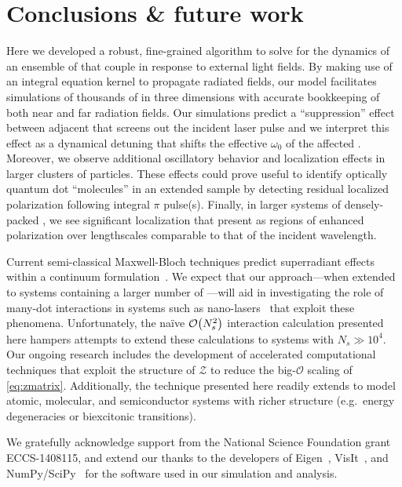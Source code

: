 \section{\label{section:conclusion}Conclusions \& future work}
Here we developed a robust, fine-grained algorithm to solve for the dynamics of an ensemble of \qds{} that couple in response to external light fields.
By making use of an integral equation kernel to propagate radiated fields, our model facilitates simulations of thousands of \qds{} in three dimensions with accurate bookkeeping of both near and far radiation fields.
Our simulations predict a ``suppression'' effect between adjacent \qds{} that screens out the incident laser pulse and we interpret this effect as a dynamical detuning that shifts the effective $\omega_0$ of the affected \qds{}.
Moreover, we observe additional oscillatory behavior and localization effects in larger clusters of particles.
These effects could prove useful to identify optically quantum dot ``molecules'' in an extended sample by detecting residual localized polarization following integral $\pi$ pulse(s).
Finally, in larger systems of densely-packed \qds{}, we see significant localization that present as regions of enhanced polarization over lengthscales comparable to that of the incident wavelength.

Current semi-classical Maxwell-Bloch techniques predict superradiant effects within a continuum formulation~\cite{Gross1982,PhysRevA.4.302,PhysRevA.4.854}.
We expect that our approach---when extended to systems containing a larger number of \qds{}---will aid in investigating the role of many-dot interactions in systems such as nano-lasers~\cite{jahnke2016giant} that exploit these phenomena.
Unfortunately, the na\"ive $\mathcal{O}\qty(N_s^2)$ interaction calculation presented here hampers attempts to extend these calculations to systems with $N_s \gg 10^4$.
Our ongoing research includes the development of accelerated computational techniques that exploit the structure of $\mathcal{Z}$ to reduce the big-$\mathcal{O}$ scaling of \cref{eq:zmatrix}.
Additionally, the technique presented here readily extends to model atomic, molecular, and semiconductor systems with richer structure (e.g.\ energy degeneracies or biexcitonic transitions).

\acknowledgments
We gratefully acknowledge support from the National Science Foundation grant ECCS-1408115, and extend our thanks to the developers of
Eigen~\cite{Eigen}, VisIt~\cite{VisIt}, and NumPy/SciPy~\cite{NumPy,SciPy} for the software used in our simulation and analysis.
